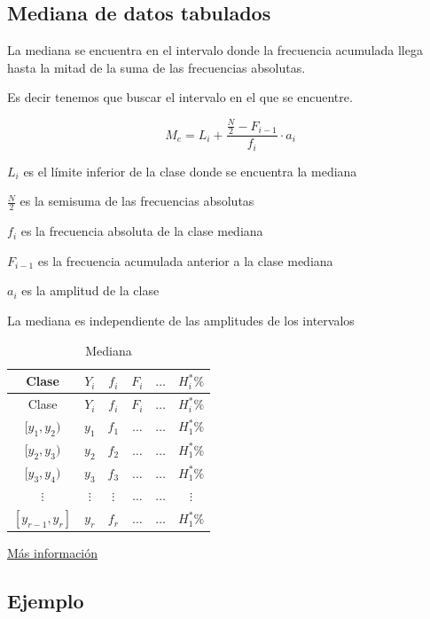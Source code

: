 \documentclass[10pt,]{krantz}
\theoremstyle{definition}
\theoremstyle{definition}
\theoremstyle{definition}
\theoremstyle{definition}
\theoremstyle{remark}
\begin{document}
\hypertarget{mediana-de-datos-tabulados}{%
\subsection{Mediana de datos tabulados}\label{mediana-de-datos-tabulados}}

La mediana se encuentra en el intervalo donde la frecuencia acumulada llega hasta la mitad de la suma de las frecuencias absolutas.

Es decir tenemos que buscar el intervalo en el que se encuentre.

\[  M_e=L_{i}+\frac{\frac{N}{2}-F_{i-1}}{f_{i}}\cdot a_{i}\]

\(L_{i}\) es el límite inferior de la clase donde se encuentra la mediana

\(\frac{N}{2}\) es la semisuma de las frecuencias absolutas

\(f_{i}\) es la frecuencia absoluta de la clase mediana

\(F_{i-1}\) es la frecuencia acumulada anterior a la clase mediana

\(a_{i}\) es la amplitud de la clase

La mediana es independiente de las amplitudes de los intervalos

\begin{longtable}[]{@{}cccccc@{}}
\caption{\label{tab:mediana} Mediana}\tabularnewline
\toprule
Clase & \(Y_i\) & \(f_i\) & \(F_i\) & \(\ldots\) & \(H_i^*\%\)\tabularnewline
\midrule
\endfirsthead
\toprule
Clase & \(Y_i\) & \(f_i\) & \(F_i\) & \(\ldots\) & \(H_i^*\%\)\tabularnewline
\midrule
\endhead
\([y_1,y_2)\) & \(y_1\) & \(f_1\) & \(\ldots\) & \(\ldots\) & \(H_1^*\%\)\tabularnewline
\([y_2,y_3)\) & \(y_2\) & \(f_2\) & \(\ldots\) & \(\ldots\) & \(H_1^*\%\)\tabularnewline
\([y_3,y_4)\) & \(y_3\) & \(f_3\) & \(\ldots\) & \(\ldots\) & \(H_1^*\%\)\tabularnewline
\(\vdots\) & \(\vdots\) & \(\vdots\) & \(\ldots\) & \(\ldots\) & \(\vdots\)\tabularnewline
\([y_{r-1},y_r]\) & \(y_r\) & \(f_r\) & \(\ldots\) & \(\ldots\) & \(H_1^*\%\)\tabularnewline
\bottomrule
\end{longtable}

\href{https://www.superprof.es/apuntes/escolar/matematicas/estadistica/descriptiva/mediana.html}{Más información}

\hypertarget{ejemplo-2}{%
\subsection{Ejemplo}\label{ejemplo-2}}
\end{document}

